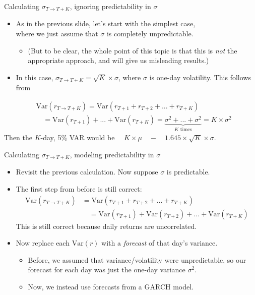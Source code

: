 \documentclass[t,12pt]{beamer}
\begin{document}
\begin{frame}[c]{Calculating $\sigma_{T \to T+K}$, ignoring predictability in $\sigma$}
\begin{itemize}
\item As in the previous slide, let's start with the simplest case,
\\ where we just assume that $\sigma$ is completely unpredictable.
\begin{itemize}
\medskip
\item (But to be clear, the whole point of this topic is that this is \emph{not} the appropriate approach, and will give us misleading results.) %
\end{itemize}
\medskip
\item In this case, $\sigma_{T \to T+K} = \sqrt{K} \times \sigma$, where $\sigma$ is one-day volatility.
This follows from %
\end{itemize}
\begin{align*}
&\text{Var}(r_{T \to T+K}) = \text{Var}(r_{T+1} + r_{T+2} + ... + r_{T+K})
\\ &\quad = \text{Var}(r_{T+1}) + ... + \text{Var}(r_{T+K}) = \underbrace{\sigma^2 + ... + \sigma^2}_{\text{$K$ times}} = K \times \sigma^2
\end{align*}
Then the $K$-day, 5\% VAR would be $\quad K \times \mu \quad - \quad 1.645 \times \sqrt{K} \times \sigma$.
\end{frame}

\begin{frame}[c]{Calculating $\sigma_{T \to T+K}$, modeling predictability in $\sigma$}
\begin{itemize}
\item Revisit the previous calculation. Now suppose $\sigma$ is predictable. %
\smallskip
\item The first step from before is still correct:
\begin{align*}
\text{Var}(r_{T \to T+K}) &= \text{Var}(r_{T+1} + r_{T+2} + ... + r_{T+K})
\\ &\quad = \text{Var}(r_{T+1}) + \text{Var}(r_{T+2}) + ... + \text{Var}(r_{T+K})
\end{align*}
This is still correct because daily returns are uncorrelated.
\smallskip
\item Now replace each $\text{Var}(r)$ with a \emph{forecast} of that day's variance.
\begin{itemize}
\smallskip
\item Before, we assumed that variance/volatility were unpredictable, 
so our forecast for each day was just the one-day variance $\sigma^2$.
\smallskip
\item Now, we instead use forecasts from a GARCH model.
\end{itemize}
\end{itemize}
\end{frame}
\end{document}
